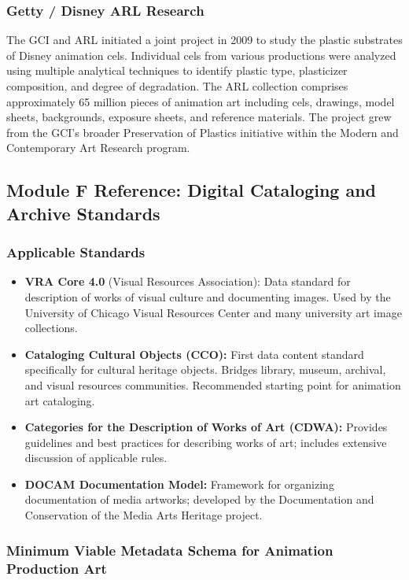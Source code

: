 \documentclass[11pt,letterpaper]{article}
\begin{document}
\subsubsection{Getty / Disney ARL Research}

The GCI and ARL initiated a joint project in 2009 to study the plastic substrates of Disney animation cels. Individual cels from various productions were analyzed using multiple analytical techniques to identify plastic type, plasticizer composition, and degree of degradation. The ARL collection comprises approximately 65 million pieces of animation art including cels, drawings, model sheets, backgrounds, exposure sheets, and reference materials. The project grew from the GCI's broader Preservation of Plastics initiative within the Modern and Contemporary Art Research program.

\subsection{Module F Reference: Digital Cataloging and Archive Standards}

\subsubsection{Applicable Standards}

\begin{itemize}
  \item \textbf{VRA Core 4.0} (Visual Resources Association): Data standard for description of works of visual culture and documenting images. Used by the University of Chicago Visual Resources Center and many university art image collections.
  \item \textbf{Cataloging Cultural Objects (CCO):} First data content standard specifically for cultural heritage objects. Bridges library, museum, archival, and visual resources communities. Recommended starting point for animation art cataloging.
  \item \textbf{Categories for the Description of Works of Art (CDWA):} Provides guidelines and best practices for describing works of art; includes extensive discussion of applicable rules.
  \item \textbf{DOCAM Documentation Model:} Framework for organizing documentation of media artworks; developed by the Documentation and Conservation of the Media Arts Heritage project.
\end{itemize}

\subsubsection{Minimum Viable Metadata Schema for Animation Production Art}
\end{document}
